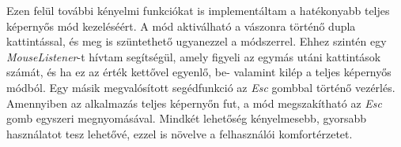 Ezen felül további kényelmi funkciókat is implementáltam a hatékonyabb teljes képernyős mód kezeléséért. A mód aktiválható a vászonra történő dupla kattintással, és meg is szüntethető ugyanezzel a módszerrel. Ehhez szintén egy \textit{MouseListener}-t hívtam segítségül, amely figyeli az egymás utáni kattintások számát, és ha ez az érték kettővel egyenlő, be- valamint kilép a teljes képernyős módból. Egy másik megvalósított segédfunkció az \textit{Esc} gombbal történő vezérlés. Amennyiben az alkalmazás teljes képernyőn fut, a mód megszakítható az \textit{Esc} gomb egyszeri megnyomásával. Mindkét lehetőség kényelmesebb, gyorsabb használatot tesz lehetővé, ezzel is növelve a felhasználói komfortérzetet.

